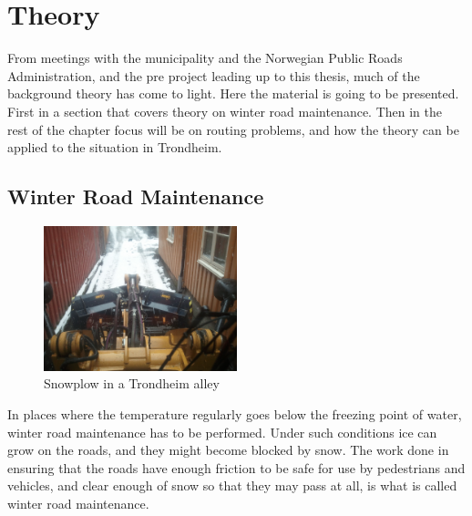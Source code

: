 \chapter{Theory}
\label{theory}

From meetings with the municipality and the Norwegian Public Roads Administration, and the pre project leading up to this thesis, much of the background theory has come to light. Here the material is going to be presented. First in a section that covers theory on winter road maintenance. Then in the rest of the chapter focus will be on routing problems, and how the theory can be applied to the situation in Trondheim.

\section{Winter Road Maintenance} %
\label{sec:snow_plowing}


\begin{figure}
	\begin{center}
		\includegraphics[width=0.5\textwidth]{figures/MachineryIllustrations/snowplow-Kent_Syrstadlokk-2012-04-18.jpg}
	\end{center}
	\caption{Snowplow in a Trondheim alley}
	\label{fig:snowplow_in_alley}
\end{figure}

In places where the temperature regularly goes below the freezing point of water, winter road maintenance has to be performed. Under such conditions ice can grow on the roads, and they might become blocked by snow. The work done in ensuring that the roads have enough friction to be safe for use by pedestrians and vehicles, and clear enough of snow so that they may pass at all, is what is called winter road maintenance.

